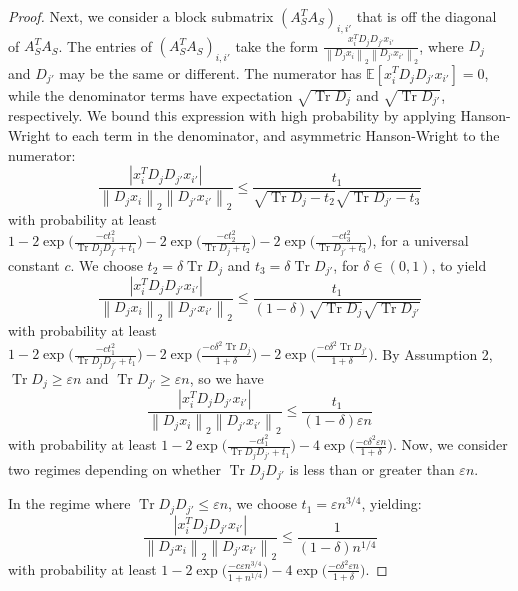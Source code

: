 \documentclass{article} %
\newcommand{\twonorm}[1]{\left\|#1\right\|_{2}}
\DeclareMathOperator{\Tr}{Tr}
\newcommand{\n}{\ensuremath{n}}
\newcommand{\EE}{\ensuremath{{\mathbb{E}}}}
\newcommand{\1}{\ensuremath{{\sf (i)}}}
\newcommand{\2}{\ensuremath{{\sf (ii)}}}
\newcommand{\3}{\ensuremath{{\sf (iii)}}}
\newcommand{\4}{\ensuremath{{\sf (iv)}}}
\newcommand{\5}{\ensuremath{{\sf (v)}}}
\newcommand{\6}{\ensuremath{{\sf (vi)}}}
\begin{document}
\begin{proof}
Next, we consider a block submatrix $(A_S^TA_S)_{i,i'}$ that is off the diagonal of $A_S^TA_S$. 
The entries of $(A_S^TA_S)_{i,i'}$ take the form $\frac{x_i^TD_jD_{j'}x_{i'}}{\twonorm{D_jx_i}\twonorm{D_{j'}x_{i'}}}$, where $D_j$ and $D_{j'}$ may be the same or different. 
The numerator has $\EE[x_i^TD_jD_{j'}x_{i'}] = 0$, while the denominator terms have expectation $\sqrt{\Tr{D_j}}$ and $\sqrt{\Tr{D_{j'}}}$, respectively. We bound this expression with high probability by applying Hanson-Wright to each term in the denominator, and asymmetric Hanson-Wright to the numerator:
\begin{equation}\label{eq:offdiagonal_tversion}
    \frac{|x_i^TD_jD_{j'}x_{i'}|}{\twonorm{D_jx_i}\twonorm{D_{j'}x_{i'}}} \leq \frac{t_1}{\sqrt{\Tr{D_j} - t_2}\sqrt{\Tr{D_{j'}} - t_3}}
\end{equation}
with probability at least $1 - 2\exp{\big(\frac{-ct_1^2}{\Tr{D_jD_{j'}}+t_1}\big)} - 2\exp{\big(\frac{-ct_2^2}{\Tr{D_j}+t_2}\big)} - 2\exp{\big(\frac{-ct_3^2}{\Tr{D_{j'}}+t_3}\big)}$, for a universal constant $c$.
We choose $t_2 = \delta\Tr{D_j}$ and $t_3 = \delta \Tr{D_{j'}}$, for $\delta \in (0,1)$, to yield
\begin{equation*}
    \frac{|x_i^TD_jD_{j'}x_{i'}|}{\twonorm{D_jx_i}\twonorm{D_{j'}x_{i'}}} \leq \frac{t_1}{(1-\delta)\sqrt{\Tr{D_j}}\sqrt{\Tr{D_{j'}}}}
\end{equation*}
with probability at least $1 - 2\exp{\big(\frac{-ct_1^2}{\Tr{D_jD_{j'}}+t_1}\big)} - 2\exp{\big(\frac{-c\delta^2\Tr{D_j}}{1+\delta}\big)} - 2\exp{\big(\frac{-c\delta^2\Tr{D_{j'}}}{1+\delta}\big)}$. By Assumption 2, $\Tr{D_j} \geq \varepsilon \n$ and $\Tr{D_{j'}} \geq \varepsilon \n$, so we have
\begin{equation*}
    \frac{|x_i^TD_jD_{j'}x_{i'}|}{\twonorm{D_jx_i}\twonorm{D_{j'}x_{i'}}} \leq \frac{t_1}{(1-\delta)\varepsilon \n}
\end{equation*}
with probability at least $1 - 2\exp{\big(\frac{-ct_1^2}{\Tr{D_jD_{j'}}+t_1}\big)} - 4\exp{\big(\frac{-c\delta^2\varepsilon \n}{1+\delta}\big)}$. Now, we consider two regimes depending on whether $\Tr{D_jD_{j'}}$ is less than or greater than $\varepsilon \n$.

In the regime where $\Tr{D_jD_{j'}} \leq \varepsilon \n$, we choose $t_1 = \varepsilon \n^{3/4}$, yielding:
\begin{equation*}
    \frac{|x_i^TD_jD_{j'}x_{i'}|}{\twonorm{D_jx_i}\twonorm{D_{j'}x_{i'}}} \leq \frac{ 1}{(1-\delta) \n^{1/4}}
\end{equation*}
with probability at least $1 - 2\exp{\big(\frac{-c\varepsilon\n^{3/4}}{1 + \n^{1/4}}\big)} - 4\exp{\big(\frac{-c\delta^2\varepsilon \n}{1+\delta}\big)}$.


\end{proof}
\end{document}
